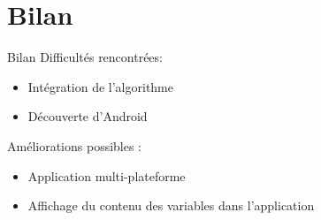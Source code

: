 \documentclass{beamer}
\begin{document}
    \section{Bilan}
    \begin{frame}{Bilan}
        Difficultés rencontrées:
        \begin{itemize}
            \item Intégration de l'algorithme
            \item Découverte d'Android
        \end{itemize}
        Améliorations possibles :
        \begin{itemize}
            \item Application multi-plateforme
            \item Affichage du contenu des variables dans l'application
        \end{itemize}
    \end{frame}
\end{document}
